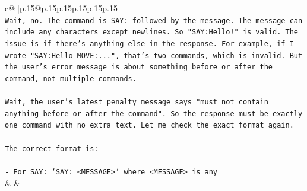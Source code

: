 \documentclass{article}
\begin{document}
{\begin{supertabular}{c@{$\;$}|p{.15\linewidth}@{}p{.15\linewidth}p{.15\linewidth}p{.15\linewidth}p{.15\linewidth}p{.15\linewidth}}
{{{\\ 
\texttt{Wait, no. The command is SAY: followed by the message. The message can include any characters except newlines. So "SAY:Hello!" is valid. The issue is if there's anything else in the response. For example, if I wrote "SAY:Hello MOVE:...", that's two commands, which is invalid. But the user's error message is about something before or after the command, not multiple commands.} \\
\\ 
\texttt{Wait, the user's latest penalty message says "must not contain anything before or after the command". So the response must be exactly one command with no extra text. Let me check the exact format again.} \\
\\ 
\texttt{The correct format is:} \\
\\ 
\texttt{{-} For SAY: `SAY: <MESSAGE>` where <MESSAGE> is any} \\
            }
        }
    }
    & & \\ \\


\end{supertabular}}
\end{document}
